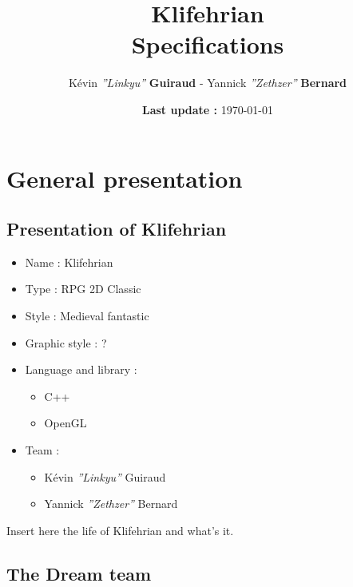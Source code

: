 \documentclass[a4paper,12pt]{book}
\title{\Huge{Klifehrian} \\ \large{Specifications}}
\author{K\'{e}vin \textit{''Linkyu''} \textbf{Guiraud} - Yannick \textit{''Zethzer''} \textbf{Bernard}}
\date{\textbf{Last update :} \today}
\begin{document}
\maketitle
\thispagestyle{empty}
\setcounter{page}{0}
\part{General presentation}
\chapter{Presentation of Klifehrian}
\begin{itemize}
\item Name : Klifehrian
\item Type : RPG 2D Classic
\item Style : Medieval fantastic
\item Graphic style : ?
\item Language and library :
\begin{itemize}
\item C++
\item OpenGL
\end{itemize}
\item Team :
\begin{itemize}
\item K\'{e}vin \textit{''Linkyu''} Guiraud
\item Yannick \textit{''Zethzer''} Bernard
\end{itemize}
\end{itemize}
Insert here the life of Klifehrian and what's it.
\chapter{The Dream team}
\end{document}
